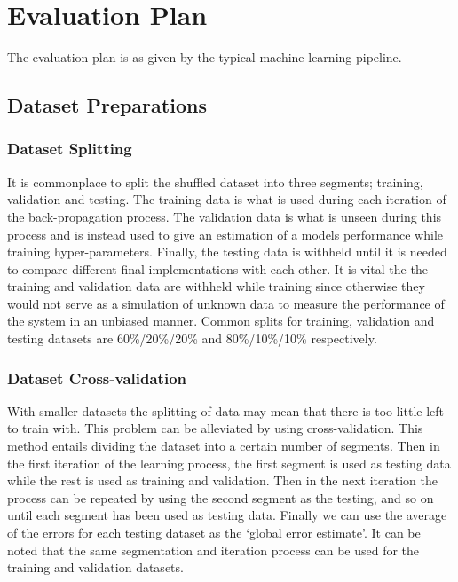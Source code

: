 \chapter{Evaluation Plan} \label{chap:evaluation_plan}

The evaluation plan is as given by the typical machine learning pipeline\cite{IntroToML}.

\section{Dataset Preparations}

\subsection{Dataset Splitting}

It is commonplace to split the shuffled dataset into  three segments; training, validation and testing. The training data is what is used during each iteration of the back-propagation process. The validation data is what is unseen during this process and is instead used to give an estimation of a models performance while training hyper-parameters. Finally, the testing data is withheld until it is needed to compare different final implementations with each other. It is vital the the training and validation data are withheld while training since otherwise they would not serve as a simulation of unknown data to measure the performance of the system in an unbiased manner. Common splits for training, validation and testing datasets are 60\%/20\%/20\% and 80\%/10\%/10\%  respectively.

\subsection{Dataset Cross-validation}

With smaller datasets the splitting of data may mean that there is too little left to train with. This problem can be alleviated by using cross-validation. This method entails dividing the dataset into a certain number of segments. Then in the first iteration of the learning process, the first segment is used as testing data while the rest is used as training and validation. Then in the next iteration the process can be repeated by using the second segment as the testing, and so on until each segment has been used as testing data. Finally we can use the average of the errors for each testing dataset as the `global error estimate'. It can be noted that the same segmentation and iteration process can be used for the training and validation datasets.

